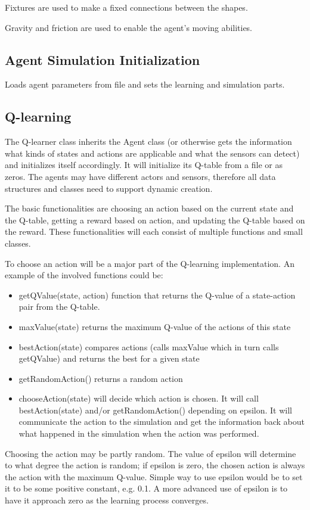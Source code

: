 \documentclass{article}
\begin{document}
Fixtures are used to make a fixed connections between the shapes.

Gravity and friction are used to enable the agent's moving abilities.

\subsection{Agent Simulation Initialization}
Loads agent parameters from file and sets the learning and simulation parts.


\subsection{Q-learning}
The Q-learner class inherits the Agent class (or otherwise gets the information
what kinds of states and actions are applicable and what the sensors can detect)
and initializes itself accordingly. It will initialize its Q-table from a file
or as zeros. The agents may have different actors and sensors,
therefore all data structures and classes
need to support dynamic creation.

The basic functionalities are choosing an action based on the current state and
the Q-table, getting a reward based on
action, and updating the Q-table based on
the reward. These functionalities will each consist of multiple functions and
small classes.

To choose an action will be a major part of the Q-learning implementation. An
example of the involved functions could be:
\begin{itemize}
  \item getQValue(state, action) function that returns the Q-value of a
    state-action pair from the Q-table.
  \item maxValue(state) returns the maximum Q-value of the actions of this state
  \item bestAction(state) compares actions (calls maxValue which in turn calls
    getQValue) and returns the best for a given state
  \item getRandomAction() returns a random action
  \item chooseAction(state) will decide which action is chosen. It will call
    bestAction(state) and/or getRandomAction() depending on epsilon. It
    will communicate the action to the simulation
    and get the information back about what happened in the simulation when the
    action was performed.
\end{itemize}
Choosing the action may be partly random. The value of epsilon will determine to
what degree the action is random; if epsilon is zero, the chosen action is
always the action with the maximum Q-value. Simple way to use epsilon would be
to set it to be some positive constant, e.g. 0.1. A more advanced use of
epsilon is to have it approach zero as the learning process converges.
\end{document}
